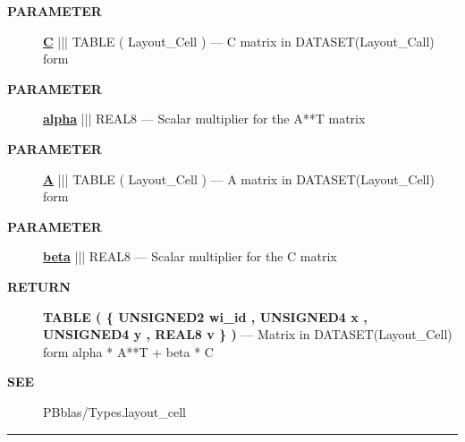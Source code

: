 \par
\begin{description}
\item [\colorbox{tagtype}{\color{white} \textbf{\textsf{PARAMETER}}}] \textbf{\underline{C}} ||| TABLE ( Layout\_Cell ) --- C matrix in DATASET(Layout\_Call) form
\item [\colorbox{tagtype}{\color{white} \textbf{\textsf{PARAMETER}}}] \textbf{\underline{alpha}} ||| REAL8 --- Scalar multiplier for the A**T matrix
\item [\colorbox{tagtype}{\color{white} \textbf{\textsf{PARAMETER}}}] \textbf{\underline{A}} ||| TABLE ( Layout\_Cell ) --- A matrix in DATASET(Layout\_Cell) form
\item [\colorbox{tagtype}{\color{white} \textbf{\textsf{PARAMETER}}}] \textbf{\underline{beta}} ||| REAL8 --- Scalar multiplier for the C matrix
\end{description}







\par
\begin{description}
\item [\colorbox{tagtype}{\color{white} \textbf{\textsf{RETURN}}}] \textbf{TABLE ( \{ UNSIGNED2 wi\_id , UNSIGNED4 x , UNSIGNED4 y , REAL8 v \} )} --- Matrix in DATASET(Layout\_Cell) form alpha * A**T + beta * C
\end{description}






\par
\begin{description}
\item [\colorbox{tagtype}{\color{white} \textbf{\textsf{SEE}}}] PBblas/Types.layout\_cell
\end{description}




\rule{\linewidth}{0.5pt}
